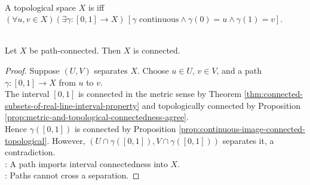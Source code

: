 \begin{definition} \label{def:topological-path-connected} \\
A topological space $X$ is  iff $(\forall u,v\in X)(\exists\gamma:[0,1]\to X)\,[\gamma\text{ continuous}\land\gamma(0)=u\land\gamma(1)=v]$.
\end{definition}

\begin{theorem} \label{thm:path-connected-implies-connected-topological} \\
Let $X$ be path-connected. Then $X$ is connected.
\begin{proof}
Suppose $(U,V)$ separates $X$. Choose $u\in U$, $v\in V$, and a path $\gamma:[0,1]\to X$ from $u$ to $v$.\\
The interval $[0,1]$ is connected in the metric sense by Theorem \ref{thm:connected-subsets-of-real-line-interval-property} and topologically connected by Proposition \ref{prop:metric-and-topological-connectedness-agree}.\\
Hence $\gamma([0,1])$ is connected by Proposition \ref{prop:continuous-image-connected-topological}. However, $(U\cap\gamma([0,1]),V\cap\gamma([0,1]))$ separates it, a contradiction.\\
: A path imports interval connectedness into $X$.\\
: Paths cannot cross a separation.
\end{proof}
\end{theorem}

